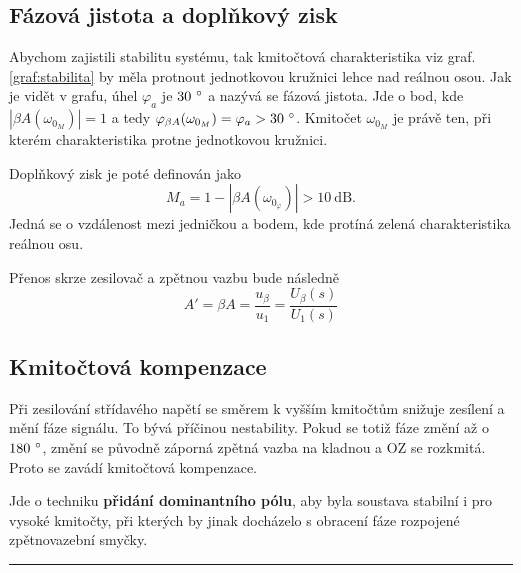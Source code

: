 \documentclass[a4paper,12pt]{article}   %
\begin{document}
\subsection*{Fázová jistota a doplňkový zisk}
Abychom zajistili stabilitu systému, tak kmitočtová charakteristika viz graf. \ref{graf:stabilita} by měla protnout jednotkovou kružnici lehce nad reálnou osou. Jak je vidět v grafu, úhel $\varphi_a$ je $30~\degree$ a nazývá se fázová jistota. Jde o bod, kde $|\beta A(\omega_{0_M})| = 1$ a tedy $\varphi_{\beta A}(\omega_{0_M}) = \varphi_a > 30~\degree$. Kmitočet $\omega_{0_M}$ je právě ten, při kterém charakteristika protne jednotkovou kružnici.

Doplňkový zisk je poté definován jako
\begin{equation*}
    M_a = 1-|\beta A(\omega_{0_\varphi})| > 10~\text{dB}.
\end{equation*}
Jedná se o vzdálenost mezi jedničkou a bodem, kde protíná zelená charakteristika reálnou osu.

Přenos skrze zesilovač a zpětnou vazbu bude následně
\begin{equation*}
    A' = \beta A = \frac{u_\beta}{u_\text{1}} = \frac{U_\beta (s)}{U_\text{1}(s)}
\end{equation*}

\subsection*{Kmitočtová kompenzace}
Při zesilování střídavého napětí se směrem k vyšším kmitočtům snižuje zesílení a mění fáze signálu. To bývá příčinou nestability. Pokud se totiž fáze změní až o $180~\degree$, změní se původně záporná zpětná vazba na kladnou a OZ se rozkmitá. Proto se zavádí kmitočtová kompenzace.

Jde o techniku \textbf{přidání dominantního pólu}, aby byla soustava stabilní i pro vysoké kmitočty, při kterých by jinak docházelo s obracení fáze rozpojené zpětnovazební smyčky.
\\
\hrule%









\end{document}
